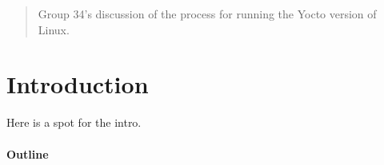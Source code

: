 \documentclass[titlepage]{article}
\begin{document}
\maketitle

\begin{abstract}
Group 34's discussion of the process for running the Yocto version of Linux.
\end{abstract}

\section{Introduction}
Here is a spot for the intro.

\paragraph{Outline}
\end{document}
